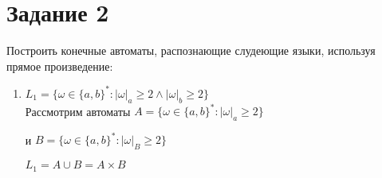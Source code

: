 \documentclass{article}
\begin{document}
    \section*{Задание 2}
    Построить конечные автоматы, распознающие слудеющие языки, используя прямое произведение:
    \begin{enumerate}
        \item \(L_1=\{\omega\in\{a,b\}^* : |\omega|_a \geqslant 2 \wedge |\omega|_b
        \geqslant 2 \} \) \\
        
    Рассмотрим автоматы 
    \(A=\{\omega\in\{a,b\}^* : |\omega|_a \geqslant 2 \} \) 
     \begin{center}
            \begin{figure}[htbp]
                \centering
                 
            \end{figure}
        \end{center}
    
    \newpage
    
    и \(B=\{\omega\in\{a,b\}^* : |\omega|_B \geqslant 2 \} \) 
     \begin{center}
            \begin{figure}[htbp]
                \centering
                
            \end{figure}
        \end{center}
        
        
    \(L_1 = A \cup B = A \times B \)  
    

\end{enumerate}
\end{document}
